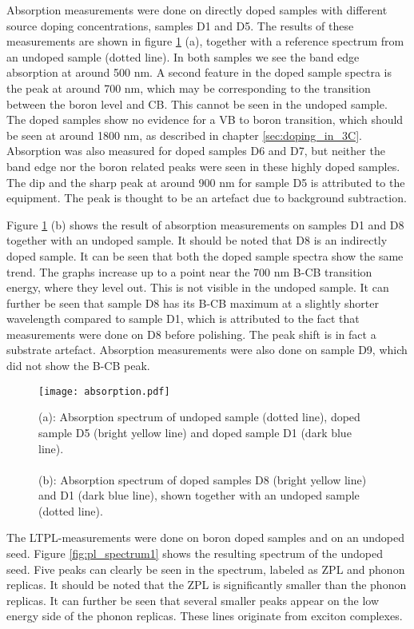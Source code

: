 Absorption measurements were done on directly doped samples with different source doping concentrations, samples D1 and D5. The results of these measurements are shown in figure \ref{fig:abs} (a), together with a reference spectrum from an undoped sample (dotted line). In both samples we see the band edge absorption at around 500 nm. A second feature in the doped sample spectra is the peak at around 700 nm, which may be corresponding to the transition between the boron level and CB. This cannot be seen in the undoped sample. The doped samples show no evidence for a VB to boron transition, which should be seen at around 1800 nm, as described in chapter \ref{sec:doping_in_3C}. Absorption was also measured for doped samples D6 and D7, but neither the band edge nor the boron related peaks were seen in these highly doped samples. The dip and the sharp peak at around 900 nm for sample D5 is attributed to  the equipment. The peak is thought to be an artefact due to background subtraction. 

Figure \ref{fig:abs} (b) shows the result of absorption measurements on samples D1 and D8 together with an undoped sample. It should be noted that D8 is an indirectly doped sample. It can be seen that both the doped sample spectra show the same trend. The graphs increase up to a point near the 700 nm B-CB transition energy, where they level out. This is not visible in the undoped sample. It can further be seen that sample D8 has its B-CB maximum at a slightly shorter wavelength compared to sample D1, which is attributed to the fact that measurements were done on D8 before polishing. The peak shift is in fact a substrate artefact. Absorption measurements were also done on sample D9, which did not show the B-CB peak. 

\begin{figure}[H]
\begin{center}
\texttt{[image: absorption.pdf]}
\caption{
(a): Absorption spectrum of undoped sample (dotted line), doped sample D5 (bright yellow line) and doped sample D1 (dark blue line). \\ \\
(b): Absorption spectrum of doped samples D8 (bright yellow line) and D1 (dark blue line), shown together with an undoped sample (dotted line). 
\label{fig:abs}}
\end{center}
\end{figure}

\newpage
The LTPL-measurements were done on boron doped samples and on an undoped seed. Figure \ref{fig:pl_spectrum1} shows the resulting spectrum of the undoped seed. Five peaks can clearly be seen in the spectrum, labeled as ZPL and phonon replicas. It should be noted that the ZPL is significantly smaller than the phonon replicas. It can further be seen that several smaller peaks appear on the low energy side of the phonon replicas. These lines originate from exciton complexes.  

